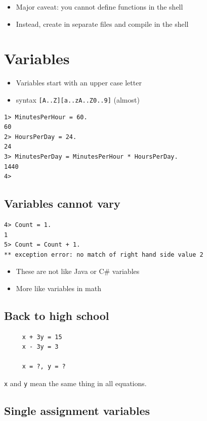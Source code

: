 \documentclass[12pt]{article}
\begin{document}
\begin{itemize}
\item Major caveat: you cannot define functions in the shell
\item Instead, create in separate files and compile in the shell
\end{itemize}

\section{Variables}

\begin{itemize}
\item Variables start with an upper case letter
\item syntax \verb+[A..Z][a..zA..Z0..9]+ (almost)
\end{itemize}

\begin{verbatim}
1> MinutesPerHour = 60.
60
2> HoursPerDay = 24.
24
3> MinutesPerDay = MinutesPerHour * HoursPerDay.
1440
4> 
\end{verbatim}

\subsection{Variables cannot vary}

\begin{verbatim}
4> Count = 1.
1
5> Count = Count + 1.
** exception error: no match of right hand side value 2
\end{verbatim}

\begin{itemize}
\item These are not like Java or C\# variables
\item More like variables in math
\end{itemize}

\subsection{Back to high school}

\begin{verbatim}
     x + 3y = 15
     x - 3y = 3

     x = ?, y = ?
\end{verbatim}


\verb+x+ and \verb+y+ mean the same thing in all equations.

\subsection{Single assignment variables}
\end{document}
